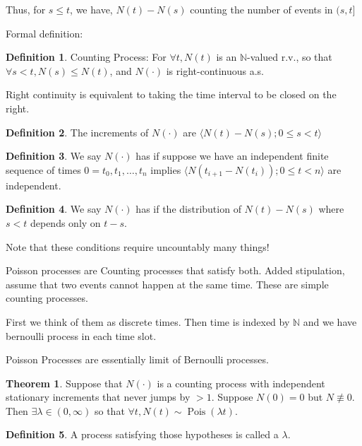 \documentclass{article}
\theoremstyle{definition}
\newtheorem{definition}{Definition}
\newtheorem{theorem}{Theorem}
\newcommand{\Pois}{\operatorname{Pois}}
\begin{document}
Thus, for \(s\leq t\), we have, \(N(t)-N(s)\) counting the number of events in \((s,t]\)  

Formal definition:

\begin{definition}
    Counting Process: For \(\forall t, N(t)\) is an \(\mathbb{N} \)-valued r.v., so that \(\forall s<t,N(s)\leq N(t)\), and \(N(\cdot)\) is right-continuous a.s.  
\end{definition}

Right continuity is equivalent to taking the time interval to be closed on the right.

\begin{definition}
    The increments of \(N(\cdot)\) are \(\langle N(t)-N(s); 0\leq s<t \rangle \) 
\end{definition}


\begin{definition}
    We say \(N(\cdot)\) has  if suppose we have an independent finite sequence of times \(0=t_0, t_1, \dots, t_n \) implies \(\langle N(t_{i+1}-N(t_i)); 0\leq t<n \rangle \) are independent.    
\end{definition}

\begin{definition}
    We say \(N(\cdot)\) has  if the distribution of \(N(t)-N(s)\) where \(s<t\) depends only on \(t-s\). 
\end{definition}

Note that these conditions require uncountably many things!

Poisson processes are Counting processes that satisfy both. Added stipulation, assume that two events cannot happen at the same time. These are simple counting processes.

First we think of them as discrete times. Then time is indexed by \(\mathbb{N} \) and we have bernoulli process in each time slot.

Poisson Processes are essentially limit of Bernoulli processes.

\begin{theorem}
    Suppose that \(N(\cdot)\) is a counting process with independent stationary increments that never jumps by \(>1\). Suppose \(N(0)=0\) but \(N\not\equiv 0\). Then \(\exists \lambda \in (0,\infty)\) so that \(\forall t, N(t)\sim \Pois(\lambda t)\).  
\end{theorem}

\begin{definition}
    A process satisfying those hypotheses is called a  \(\lambda\). 
\end{definition}
\end{document}
